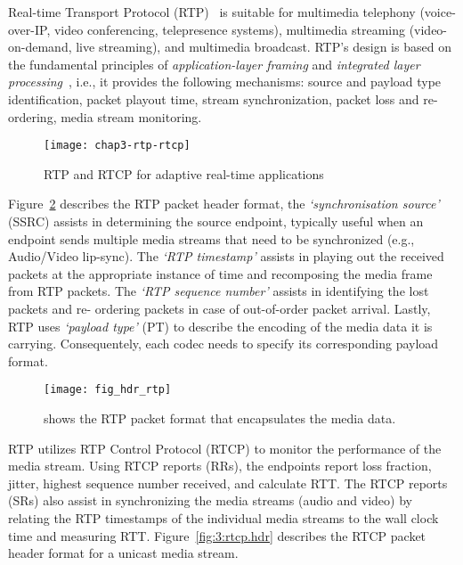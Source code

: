 
Real-time Transport Protocol (RTP)~\cite{rfc3550} is suitable for multimedia
telephony (voice-over-IP, video conferencing, telepresence systems),
multimedia streaming (video-on-demand, live streaming), and multimedia
broadcast. RTP's design is based on the fundamental principles of \textit
{application-layer framing} and \textit{integrated layer
processing}~\cite{clark:alf}, i.e., it provides the following mechanisms:
source and payload type identification, packet playout time, stream
synchronization, packet loss and re-ordering, media stream monitoring.

\begin{figure}[!h]
\centerline{\texttt{[image: chap3-rtp-rtcp]}}
\caption{RTP and RTCP for adaptive real-time applications}
\label{fig:3:rtp:model}
\end{figure}

Figure~\ref{fig:3:rtp.hdr} describes the RTP packet header format, the
\textit{`synchronisation source'} (SSRC) assists in determining the source
endpoint, typically useful when an endpoint sends multiple media streams that
need to be synchronized (e.g., Audio/Video lip-sync). The \textit{`RTP
timestamp'} assists in playing out the received packets at the appropriate
instance of time and recomposing the media frame from RTP packets. The
\textit{`RTP sequence number'} assists in identifying the lost packets and re-
ordering packets in case of out-of-order packet arrival. Lastly, RTP uses
\textit{`payload type'} (PT) to describe the encoding of the media data it is
carrying. Consequentely, each codec needs to specify its corresponding payload
format.

\begin{figure}[!h]
\centerline{\texttt{[image: fig\_hdr\_rtp]}}
\caption{shows the RTP packet format that encapsulates the media data.}
\label{fig:3:rtp.hdr}
\end{figure}

RTP utilizes RTP Control Protocol (RTCP) to monitor the performance of the
media stream. Using RTCP reports (RRs), the endpoints report loss fraction,
jitter, highest sequence number received, and calculate RTT. The RTCP reports
(SRs) also assist in synchronizing the media streams (audio and video) by
relating the RTP timestamps of the individual media streams to the wall clock
time and measuring RTT. Figure~\ref{fig:3:rtcp.hdr} describes the RTCP packet
header format for a unicast media stream.


